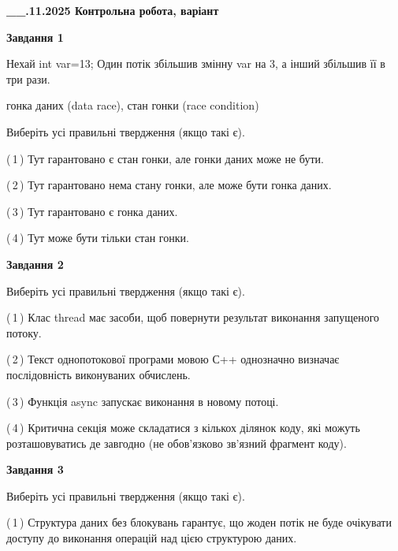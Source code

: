 \documentclass[12pt, ukrainian]{article}
\begin{document}
\begin {large}

\textbf{\_\_.11.2025 Контрольна робота, варіант  }\par


{

\begin{center}
\textbf{Завдання 1}
\end{center}
Нехай int var=13; Один потік збільшив змінну var на 3, а інший збільшив її в три рази.

гонка даних (data race), стан гонки (race condition)

Виберіть усі правильні твердження (якщо такі є).\par
\vspace{2mm}
(\,1\,) Тут гарантовано є стан гонки, але гонки даних може не бути.%

(\,2\,) Тут гарантовано нема стану гонки, але може бути гонка даних.%

(\,3\,) Тут гарантовано є гонка даних.%

(\,4\,) Тут може бути тільки стан гонки.%



\begin{center}
\textbf{Завдання 2}
\end{center}
Виберіть усі правильні твердження (якщо такі є).\par
\vspace{2mm}

(\,1\,) Клас thread має засоби, щоб повернути результат виконання запущеного потоку.%

(\,2\,) Текст однопотокової програми мовою С++ однозначно визначає послідовність виконуваних обчислень.%

(\,3\,) Функція async запускає виконання в новому потоці.%

(\,4\,) Критична секція може складатися з кількох ділянок коду, які можуть розташовуватись де завгодно (не обов’язково зв’язний фрагмент коду).%



\begin{center}
\textbf{Завдання 3}
\end{center}
Виберіть усі правильні твердження (якщо такі є).\par
\vspace{2mm}

(\,1\,) Структура даних без блокувань гарантує, що жоден потік не буде очікувати доступу до виконання операцій над цією структурою даних.%

}
\end{large}
\end{document}
